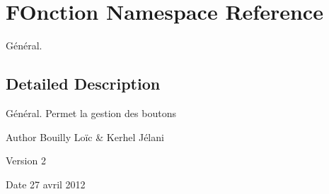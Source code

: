 \hypertarget{namespace_f_onction}{\section{\-F\-Onction \-Namespace \-Reference}
\label{namespace_f_onction}
}


\-Général.  




\subsection{\-Detailed \-Description}
\-Général. \-Permet la gestion des boutons \begin{DoxyAuthor}{\-Author}
\-Bouilly \-Loïc \& \-Kerhel \-Jélani 
\end{DoxyAuthor}
\begin{DoxyVersion}{\-Version}
2 
\end{DoxyVersion}
\begin{DoxyDate}{\-Date}
27 avril 2012 
\end{DoxyDate}
